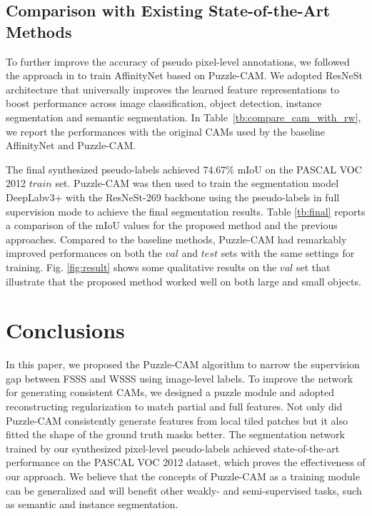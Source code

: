 \documentclass{article}
\begin{document}
\subsection{Comparison with Existing State-of-the-Art Methods}
\label{ssec:comparisons}

To further improve the accuracy of pseudo pixel-level annotations, we followed the approach in \cite{ahn2018learning} to train AffinityNet based on Puzzle-CAM. 
We adopted ResNeSt architecture that universally improves the learned feature representations to boost performance across image classification, object detection, instance segmentation and semantic segmentation. 
In Table~\ref{tb:compare_cam_with_rw}, we report the performances with the original CAMs used by the baseline AffinityNet \cite{ahn2018learning} and Puzzle-CAM.

The final synthesized pseudo-labels achieved $74.67\%$ mIoU on the PASCAL VOC 2012 $train$ set.
Puzzle-CAM was then used to train the segmentation model DeepLabv3+ \cite{chen2018encoder} with the ResNeSt-269 \cite{zhang2020resnest} backbone using the pseudo-labels in full supervision mode to achieve the final segmentation results. 
Table \ref{tb:final} reports a comparison of the mIoU values for the proposed method and the previous approaches. 
Compared to the baseline methods, Puzzle-CAM had remarkably improved performances on both the $val$ and $test$ sets with the same settings for training.
Fig. \ref{fig:result} shows some qualitative results on the $val$ set that illustrate that the proposed method worked well on both large and small objects.








\section{Conclusions}
\label{sec:conclusion}

In this paper, we proposed the Puzzle-CAM algorithm to narrow the supervision gap between FSSS and WSSS using image-level labels. 
To improve the network for generating consistent CAMs, we designed a puzzle module and adopted reconstructing regularization to match partial and full features.
Not only did Puzzle-CAM consistently generate features from local tiled patches but it also fitted the shape of the ground truth masks better. 
The segmentation network trained by our synthesized pixel-level pseudo-labels achieved state-of-the-art performance on the PASCAL VOC 2012 dataset, which proves the effectiveness of our approach. 
We believe that the concepts of Puzzle-CAM as a training module can be generalized and will benefit other weakly- and semi-supervised tasks, such as semantic and instance segmentation.
\end{document}

